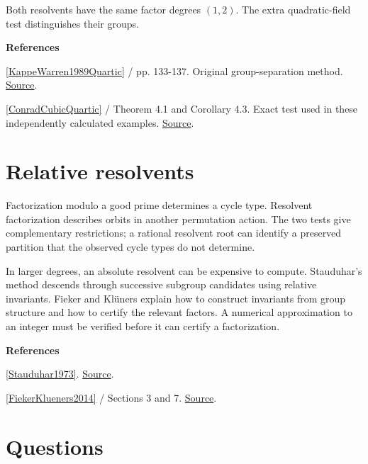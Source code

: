 \documentclass[11pt,a4paper,oneside,openany]{book}
\newenvironment{sources}{\par\smallskip\begingroup\footnotesize\color{atlasgray}\leftskip=10pt\setlength{\parskip}{2pt}}{\par\endgroup\smallskip}
\begin{document}
\color{black} Both resolvents have the same factor degrees \((1,2)\). The extra quadratic-field test distinguishes their groups.\par
\begin{sources}
\textbf{References}\par\smallskip
\noindent\hyperlink{ref:KappeWarren1989Quartic}{[KappeWarren1989Quartic]} / pp. 133-137. Original group-separation method. \href{https://www.jstor.org/stable/2323198}{Source}.\par
\noindent\hyperlink{ref:ConradCubicQuartic}{[ConradCubicQuartic]} / Theorem 4.1 and Corollary 4.3. Exact test used in these independently calculated examples. \href{https://kconrad.math.uconn.edu/blurbs/galoistheory/cubicquartic.pdf}{Source}.\par
\end{sources}\color{black}
\section{Relative resolvents}
\color{black} Factorization modulo a good prime determines a cycle type. Resolvent factorization describes orbits in another permutation action. The two tests give complementary restrictions; a rational resolvent root can identify a preserved partition that the observed cycle types do not determine.\par
\color{black} In larger degrees, an absolute resolvent can be expensive to compute. Stauduhar's method descends through successive subgroup candidates using relative invariants. Fieker and Klüners explain how to construct invariants from group structure and how to certify the relevant factors. A numerical approximation to an integer must be verified before it can certify a factorization.\par
\begin{sources}
\textbf{References}\par\smallskip
\noindent\hyperlink{ref:Stauduhar1973}{[Stauduhar1973]}.  \href{https://doi.org/10.1090/S0025-5718-1973-0327712-4}{Source}.\par
\noindent\hyperlink{ref:FiekerKlueners2014}{[FiekerKlueners2014]} / Sections 3 and 7.  \href{https://doi.org/10.1112/S1461157013000302}{Source}.\par
\end{sources}\color{black}
\section*{Questions}
\end{document}
